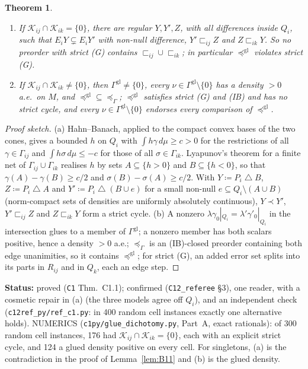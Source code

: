 \documentclass[11pt]{article}
\newtheorem{theorem}{Theorem}[section]
\theoremstyle{definition}
\theoremstyle{remark}
\newcommand{\sd}{\mathbin{\triangle}}
\newcommand{\src}[1]{\texttt{#1}}
\newcommand{\status}[1]{\par\smallskip\noindent\textbf{Status:} #1\par\smallskip}
\begin{document}
\begin{theorem}\label{thm:C11}
\begin{enumerate}[leftmargin=*,label=(\alph*)]
\item If $\mathcal K_{ij}\cap\mathcal K_{ik}=\{0\}$, there are regular $Y,Y',Z$, with all differences inside $Q_i$, such that $E_iY\subsetneq E_iY'$ with non-null difference, $Y'\sqsubset_{ij}Z$ and $Z\sqsubset_{ik}Y$. So no preorder with strict (G) contains $\sqsubset_{ij}\cup\sqsubset_{ik}$; in particular $\preceq^{\mathrm{gl}}$ violates strict (G).
\item If $\mathcal K_{ij}\cap\mathcal K_{ik}\ne\{0\}$, then $\Gamma^{\mathrm{gl}}\ne\{0\}$, every $\nu\in\Gamma^{\mathrm{gl}}\setminus\{0\}$ has a density $>0$ a.e.\ on $M$, and $\preceq^{\mathrm{gl}}\subseteq\preceq_\Gamma$; $\preceq^{\mathrm{gl}}$ satisfies strict (G) and (IB) and has no strict cycle, and every $\nu\in\Gamma^{\mathrm{gl}}\setminus\{0\}$ endorses every comparison of $\preceq^{\mathrm{gl}}$.
\end{enumerate}
\end{theorem}
\begin{proof}[Proof sketch]
(a) Hahn--Banach, applied to the compact convex bases of the two cones, gives a bounded $h$ on $Q_i$ with $\int h\gamma\,d\mu\ge c>0$ for the restrictions of all $\gamma\in\Gamma_{ij}$ and $\int h\sigma\,d\mu\le-c$ for those of all $\sigma\in\Gamma_{ik}$. Lyapunov's theorem for a finite net of $\Gamma_{ij}\cup\Gamma_{ik}$ realises $h$ by sets $A\subseteq\{h>0\}$ and $B\subseteq\{h<0\}$, so that $\gamma(A)-\gamma(B)\ge c/2$ and $\sigma(B)-\sigma(A)\ge c/2$. With $Y\coloneqq P_i\sd B$, $Z\coloneqq P_i\sd A$ and $Y'\coloneqq P_i\sd(B\cup e)$ for a small non-null $e\subseteq Q_i\setminus(A\cup B)$ (norm-compact sets of densities are uniformly absolutely continuous), $Y\prec Y'$, $Y'\sqsubset_{ij}Z$ and $Z\sqsubset_{ik}Y$ form a strict cycle. (b) A nonzero $\lambda\gamma_0|_{Q_i}=\lambda'\gamma'_0|_{Q_i}$ in the intersection glues to a member of $\Gamma^{\mathrm{gl}}$; a nonzero member has both scalars positive, hence a density $>0$ a.e.; $\preceq_\Gamma$ is an (IB)-closed preorder containing both edge unanimities, so it contains $\preceq^{\mathrm{gl}}$; for strict (G), an added error set splits into its parts in $R_{ij}$ and in $Q_k$, each an edge step.
\end{proof}
\status{proved (\src{C1} Thm.~C1.1); confirmed (\src{C12\_referee} \S3), one reader, with a cosmetic repair in (a) (the three models agree off $Q_i$), and an independent check (\src{c12ref\_py/ref\_c1.py}: in 400 random cell instances exactly one alternative holds). NUMERICS (\src{c1py/glue\_dichotomy.py}, Part~A, exact rationals): of 300 random cell instances, 176 had $\mathcal K_{ij}\cap\mathcal K_{ik}=\{0\}$, each with an explicit strict cycle, and 124 a glued density positive on every cell. For singletons, (a) is the contradiction in the proof of Lemma~\ref{lem:B11} and (b) is the glued density.}
\end{document}
